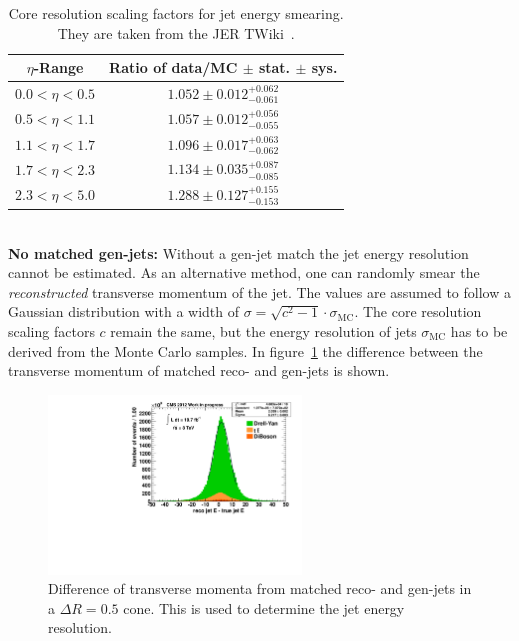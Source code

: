   \begin{table}[htbp!]
    \centering
    {\renewcommand{\arraystretch}{1.2}
      \begin{tabular}{|c|c|}
        \hline
        $\eta$-Range & Ratio of data/MC $\pm$ stat. $\pm$ sys. \\ \hline \hline
        $0.0 < \eta < 0.5$ & $1.052 \pm 0.012 ^{+0.062}_{-0.061}$ \\ \hline
        $0.5 < \eta < 1.1$ & $1.057 \pm 0.012 ^{+0.056}_{-0.055}$ \\ \hline
        $1.1 < \eta < 1.7$ & $1.096 \pm 0.017 ^{+0.063}_{-0.062}$ \\ \hline
        $1.7 < \eta < 2.3$ & $1.134 \pm 0.035 ^{+0.087}_{-0.085}$ \\ \hline
        $2.3 < \eta < 5.0$ & $1.288 \pm 0.127 ^{+0.155}_{-0.153}$ \\ \hline
      \end{tabular}
    }
    \caption{Core resolution scaling factors for jet energy smearing. They are taken from the JER TWiki~\cite{jer}.}
    \label{tab:jerfactors}
  \end{table} \\
  
\textbf{No matched gen-jets:} Without a gen-jet match the jet energy resolution cannot be estimated. As an alternative method, one can randomly smear the \textit{reconstructed} transverse momentum of the jet. The values are assumed to follow a Gaussian distribution with a width of $\sigma = \sqrt{c^2-1} \cdot \sigma_{\text{MC}}$. The core resolution scaling factors $c$ remain the same, but the energy resolution of jets $\sigma_{\text{MC}}$ has to be derived from the Monte Carlo samples. In figure~\ref{fig:jerdeltapt} the difference between the transverse momentum of matched reco- and gen-jets is shown.

  \begin{figure}[htb!]
    \centering
    \includegraphics[width=0.6\textwidth]{plots/jer_deltapt.pdf}
    \caption{Difference of transverse momenta from matched reco- and gen-jets in a $\Delta R = 0.5$ cone. This is used to determine the jet energy resolution.}
    \label{fig:jerdeltapt}
  \end{figure}
 
